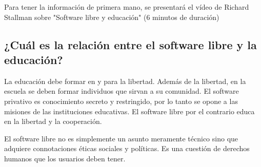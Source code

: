 \documentclass[11pt,letterpaper]{article}
\begin{document}
Para tener la información de primera mano, se presentará el vídeo de Richard Stallman sobre "Software libre y educación" (6 minutos de duración)\cite{rms}
\subsection{¿Cuál es la relación entre el software libre y la educación?}
La educación debe formar en y para la libertad. Además de la libertad, en la escuela se deben formar individuos que sirvan a su comunidad. El software privativo es conocimiento secreto y restringido, por lo tanto se opone a las misiones de las instituciones educativas. El software libre por el contrario educa en la libertad y la cooperación.

El software libre no es simplemente un asunto meramente técnico sino que adquiere connotaciones éticas sociales y políticas. Es una cuestión de derechos humanos que los usuarios deben tener.\cite{rms}
\end{document}
